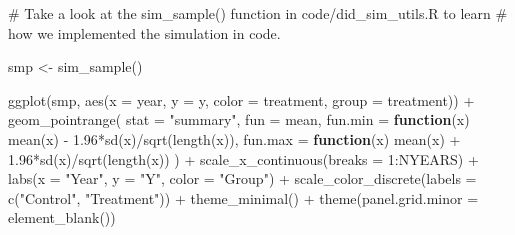 \documentclass[
  letterpaper,
  DIV=11,
  numbers=noendperiod]{scrartcl}
\newenvironment{Shaded}{\begin{snugshade}}{\end{snugshade}}
\newcommand{\AttributeTok}[1]{\textcolor[rgb]{0.40,0.45,0.13}{#1}}
\newcommand{\CommentTok}[1]{\textcolor[rgb]{0.37,0.37,0.37}{#1}}
\newcommand{\ControlFlowTok}[1]{\textcolor[rgb]{0.00,0.23,0.31}{\textbf{#1}}}
\newcommand{\DecValTok}[1]{\textcolor[rgb]{0.68,0.00,0.00}{#1}}
\newcommand{\FloatTok}[1]{\textcolor[rgb]{0.68,0.00,0.00}{#1}}
\newcommand{\FunctionTok}[1]{\textcolor[rgb]{0.28,0.35,0.67}{#1}}
\newcommand{\NormalTok}[1]{\textcolor[rgb]{0.00,0.23,0.31}{#1}}
\newcommand{\OtherTok}[1]{\textcolor[rgb]{0.00,0.23,0.31}{#1}}
\newcommand{\SpecialCharTok}[1]{\textcolor[rgb]{0.37,0.37,0.37}{#1}}
\newcommand{\StringTok}[1]{\textcolor[rgb]{0.13,0.47,0.30}{#1}}
\begin{document}
\begin{Shaded}
\begin{Highlighting}[]
\CommentTok{\# Take a look at the sim\_sample() function in \textasciigrave{}code/did\_sim\_utils.R\textasciigrave{} to learn}
\CommentTok{\# how we implemented the simulation in code.}

\NormalTok{smp }\OtherTok{\textless{}{-}} \FunctionTok{sim\_sample}\NormalTok{()}

\FunctionTok{ggplot}\NormalTok{(smp, }\FunctionTok{aes}\NormalTok{(}\AttributeTok{x =}\NormalTok{ year, }\AttributeTok{y =}\NormalTok{ y, }\AttributeTok{color =}\NormalTok{ treatment, }\AttributeTok{group =}\NormalTok{ treatment)) }\SpecialCharTok{+}
    \FunctionTok{geom\_pointrange}\NormalTok{(}
        \AttributeTok{stat =} \StringTok{"summary"}\NormalTok{,}
        \AttributeTok{fun =}\NormalTok{ mean, }
        \AttributeTok{fun.min =} \ControlFlowTok{function}\NormalTok{(x) }\FunctionTok{mean}\NormalTok{(x) }\SpecialCharTok{{-}} \FloatTok{1.96}\SpecialCharTok{*}\FunctionTok{sd}\NormalTok{(x)}\SpecialCharTok{/}\FunctionTok{sqrt}\NormalTok{(}\FunctionTok{length}\NormalTok{(x)), }
        \AttributeTok{fun.max =} \ControlFlowTok{function}\NormalTok{(x) }\FunctionTok{mean}\NormalTok{(x) }\SpecialCharTok{+} \FloatTok{1.96}\SpecialCharTok{*}\FunctionTok{sd}\NormalTok{(x)}\SpecialCharTok{/}\FunctionTok{sqrt}\NormalTok{(}\FunctionTok{length}\NormalTok{(x)) }
\NormalTok{    ) }\SpecialCharTok{+}
    \FunctionTok{scale\_x\_continuous}\NormalTok{(}\AttributeTok{breaks =} \DecValTok{1}\SpecialCharTok{:}\NormalTok{NYEARS) }\SpecialCharTok{+}
    \FunctionTok{labs}\NormalTok{(}\AttributeTok{x =} \StringTok{"Year"}\NormalTok{, }\AttributeTok{y =} \StringTok{"Y"}\NormalTok{, }\AttributeTok{color =} \StringTok{"Group"}\NormalTok{) }\SpecialCharTok{+}
    \FunctionTok{scale\_color\_discrete}\NormalTok{(}\AttributeTok{labels =} \FunctionTok{c}\NormalTok{(}\StringTok{"Control"}\NormalTok{, }\StringTok{"Treatment"}\NormalTok{)) }\SpecialCharTok{+} 
    \FunctionTok{theme\_minimal}\NormalTok{() }\SpecialCharTok{+}
    \FunctionTok{theme}\NormalTok{(}\AttributeTok{panel.grid.minor =} \FunctionTok{element\_blank}\NormalTok{())}
\end{Highlighting}
\end{Shaded}
\end{document}
